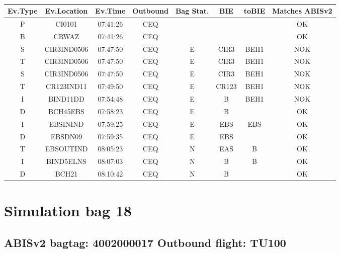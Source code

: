 \documentclass{report}
\begin{document}
\paragraph{}
\begin{longtable}{cccccccc}    \toprule
\rowcolor{white!50}
\textbf{Ev.Type} & \textbf{Ev.Location} & \textbf{Ev.Time} & \textbf{Outbound} & \textbf{Bag Stat.} & \textbf{BIE} & \textbf{toBIE} & \textbf{Matches ABISv2} \\\midrule
P & CI0101 & 07:41:26  & CEQ &  &  &  & OK\\
B & CRWAZ & 07:41:26  & CEQ &  &  &  & OK\\
S & CIR3IND0506 & 07:47:50  & CEQ & E & CIR3 & BEH1 & NOK\\
T & CIR3IND0506 & 07:47:50  & CEQ & E & CIR3 & BEH1 & NOK\\
S & CIR3IND0506 & 07:47:50  & CEQ & E & CIR3 & BEH1 & NOK\\
T & CR123IND11 & 07:49:50  & CEQ & E & CR123 & BEH1 & NOK\\
I & BIND11DD & 07:54:48  & CEQ & E & B & BEH1 & NOK\\
D & BCH45EBS & 07:58:23  & CEQ & E & B &  & OK\\
I & EBSININD & 07:59:25  & CEQ & E & EBS & EBS & OK\\
D & EBSDN09 & 07:59:35  & CEQ & E & EBS &  & OK\\
T & EBSOUTIND & 08:05:23  & CEQ & N & EAS & B & OK\\
I & BIND5ELNS & 08:07:03  & CEQ & N & B & B & OK\\
D & BCH21 & 08:10:42  & CEQ & N & B &  & OK\\
\bottomrule
\end{longtable}
\pagebreak
\section*{Simulation bag 18}
\subsection*{ABISv2 bagtag: 4002000017 Outbound flight: TU100}
\end{document}
